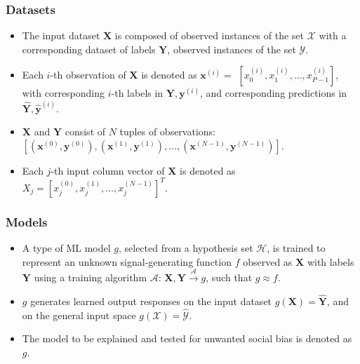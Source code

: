 \documentclass[information,article,submit,moreauthors,pdftex]{definitions/mdpi}
\begin{document}
\subsubsection{Datasets} 

	\begin{itemize}
		\item The input dataset $\mathbf{X}$ is composed of observed instances of the set $\mathcal{X}$ with a corresponding dataset of labels $\mathbf{Y}$, observed instances of the set $\mathcal{Y}$. 
		\item Each $i$-th observation of $\mathbf{X}$ is denoted as $\mathbf{x}^{(i)} = $  
		$[x_0^{(i)}, x_1^{(i)}, \dots, x_{\textit{P}-1}^{(i)}]$, with corresponding $i$-th labels in $\mathbf{Y}, \mathbf{y}^{(i)}$, and corresponding predictions in $\mathbf{\hat{Y}}, \mathbf{\hat{y}}^{(i)}$. %
		\item $\mathbf{X}$ and $\mathbf{Y}$ consist of $N$ tuples of observations: $[(\mathbf{x}^{(0)},\mathbf{y}^{(0)}), (\mathbf{x}^{(1)},\mathbf{y}^{(1)}), \dots,(\mathbf{x}^{(N-1)},\mathbf{y}^{(N-1)})]$. %
		\item Each $j$-th input column vector of $\mathbf{X}$ is denoted as $X_j = [x_{j}^{(0)}, x_{j}^{(1)}, \dots, x_{j}^{(N-1)}]^T$.
	\end{itemize}	 

\subsubsection{Models}

	\begin{itemize}
		\item A type of ML model $g$, selected from a hypothesis set $\mathcal{H}$, is trained to represent an unknown signal-generating function $f$ observed as  $\mathbf{X}$ with labels $\mathbf{Y}$ using a training algorithm $\mathcal{A}$: 
		$ \mathbf{X}, \mathbf{Y} \xrightarrow{\mathcal{A}} g$, such that $g \approx f$.
		\item $g$ generates learned output responses on the input dataset $g(\mathbf{X}) = \mathbf{\hat{Y}}$, and on the general input space $g(\mathcal{X}) = \mathcal{\hat{Y}}$.
		\item The model to be explained and tested for unwanted social bias is denoted as $g$.
	\end{itemize}
\end{document}
